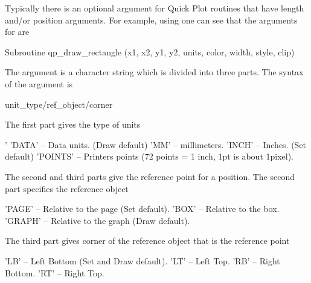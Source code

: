 Typically there is an optional  argument for Quick Plot routines that
have length and/or position arguments. For example, using  one can
see that the arguments for  are
\begin{example}
  Subroutine qp_draw_rectangle (x1, x2, y1, y2, units, color, width, style, clip)
\end{example}
The  argument is a character string which is divided into three
parts. The syntax of the  argument is
\begin{example}
  unit_type/ref_object/corner
\end{example}
The first part  gives the type of units
\begin{example}
  '%
  'DATA'    -- Data units. (Draw default)
  'MM'      -- millimeters.
  'INCH'    -- Inches. (Set default)
  'POINTS'  -- Printers points (72 points = 1 inch, 1pt is about 1pixel).
\end{example}
The second and third parts give the reference point for a position.
The second part specifies the reference object
\begin{example}
    'PAGE'  -- Relative to the page (Set default).
    'BOX'   -- Relative to the box.
    'GRAPH' -- Relative to the graph (Draw default).
\end{example}
The third part gives corner of the reference object that is the reference point
\begin{example}
    'LB'    -- Left Bottom (Set and Draw default).
    'LT'    -- Left Top.
    'RB'    -- Right Bottom.
    'RT'    -- Right Top.
\end{example}

